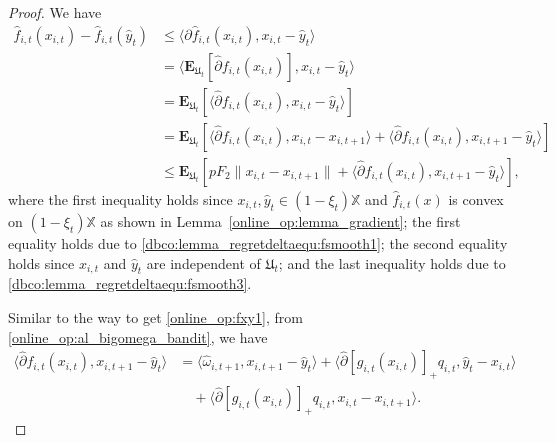 \documentclass[12pt,draftcls,onecolumn]{IEEEtran}%
\begin{document}
\begin{proof}
We have
\begin{align}\label{online_op:fxy_bandit}
\hat{f}_{i,t}(x_{i,t})-\hat{f}_{i,t}(\hat{y}_t)&\le\langle\partial \hat{f}_{i,t}(x_{i,t}),x_{i,t}-\hat{y}_t\rangle\nonumber\\
&=\langle\mathbf{E}_{\mathfrak{U}_{t}}[\hat{\partial} f_{i,t}(x_{i,t})],x_{i,t}-\hat{y}_t\rangle\nonumber\\
&=\mathbf{E}_{\mathfrak{U}_{t}}[\langle\hat{\partial}f_{i,t}(x_{i,t}),
x_{i,t}-\hat{y}_t\rangle]\nonumber\\
&=\mathbf{E}_{\mathfrak{U}_{t}}[\langle\hat{\partial}f_{i,t}(x_{i,t}),x_{i,t}-x_{i,t+1}\rangle
+\langle\hat{\partial}f_{i,t}(x_{i,t}),x_{i,t+1}-\hat{y}_t\rangle]\nonumber\\
&\le \mathbf{E}_{\mathfrak{U}_{t}}[pF_2\|x_{i,t}-x_{i,t+1}\|
+\langle\hat{\partial}f_{i,t}(x_{i,t}),x_{i,t+1}-\hat{y}_t\rangle],
\end{align}
where the first inequality holds since $x_{i,t},\hat{y}_t\in(1-\xi_t)\mathbb{X}$ and $\hat{f}_{i,t}(x)$ is convex on $(1-\xi_{t})\mathbb{X}$ as shown in Lemma~\ref{online_op:lemma_gradient}; the first equality holds due to \eqref{dbco:lemma_regretdeltaequ:fsmooth1}; the second equality holds since $x_{i,t}$ and $\hat{y}_t$ are independent of $\mathfrak{U}_{t}$; and the last inequality holds due to \eqref{dbco:lemma_regretdeltaequ:fsmooth3}.

Similar to the way to get \eqref{online_op:fxy1}, from \eqref{online_op:al_bigomega_bandit}, we have
\begin{align}
\langle\hat{\partial}f_{i,t}(x_{i,t}),x_{i,t+1}-\hat{y}_t\rangle
&=\langle\hat{\omega}_{i,t+1},x_{i,t+1}-\hat{y}_t\rangle
+\langle\hat{\partial}[g_{i,t}(x_{i,t})]_+ q_{i,t},\hat{y}_t-x_{i,t}\rangle\nonumber\\
&\quad+\langle\hat{\partial}[g_{i,t}(x_{i,t})]_+ q_{i,t},x_{i,t}-x_{i,t+1}\rangle.\label{online_op:fxy1_bandit}
\end{align}


\end{proof}
\end{document}
